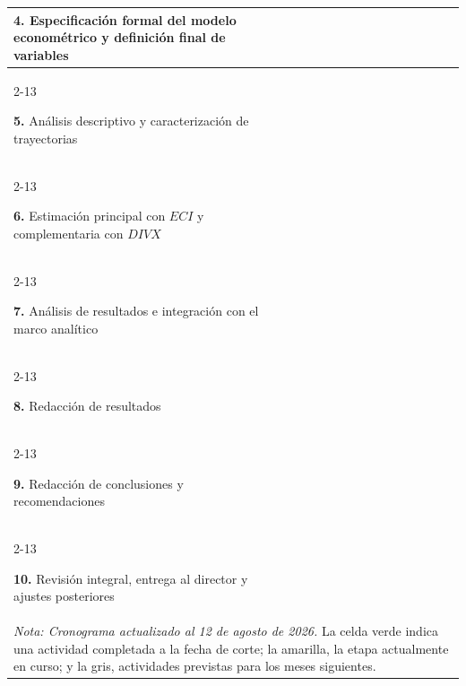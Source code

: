 \documentclass[../../TFM.tex]{subfiles}
\begin{document}
\begin{longtable}{|p{6.2cm}|*{12}{c|}}
		\textbf{4.} Especificación formal del modelo econométrico y definición final de variables
		&  &  & \cellcolor{green!20} & \cellcolor{green!20} &  &  &  &  &  &  &  &  \\
		\cline{2-13}
 
		\textbf{5.} Análisis descriptivo y caracterización de trayectorias
		&  &  & \cellcolor{green!20} & \cellcolor{green!20} & \cellcolor{green!20} &  &  &  &  &  &  &  \\
		\cline{2-13}
 
		\textbf{6.} Estimación principal con $ECI$ y complementaria con $DIVX$
		&  &  &  & \cellcolor{green!20} & \cellcolor{green!20} & \cellcolor{green!20} &  &  &  &  &  &  \\
		\cline{2-13}
 
		\textbf{7.} Análisis de resultados e integración con el marco analítico
		&  &  &  &  &  & \cellcolor{green!20} & \cellcolor{green!20} & \cellcolor{green!20} &  &  &  &  \\
		\cline{2-13}
 
		\textbf{8.} Redacción de resultados
		&  &  &  &  &  & \cellcolor{green!20} & \cellcolor{green!20} & \cellcolor{green!20} &  &  &  &  \\
		\cline{2-13}
 
		\textbf{9.} Redacción de conclusiones y recomendaciones
		&  &  &  &  &  &  &  & \cellcolor{green!20} &  &  &  &  \\
		\cline{2-13}
 
		\textbf{10.} Revisión integral, entrega al director y ajustes posteriores
		&  &  &  &  &  &  &  & \cellcolor{yellow!50} & \cellcolor{gray!30} & \cellcolor{gray!30} & \cellcolor{gray!30} &  \\
 
		\hline
		\multicolumn{13}{p{\dimexpr\textwidth-2\tabcolsep\relax}}{%
			\textit{Nota: Cronograma actualizado al 12 de agosto de 2026.} La celda
			verde indica una actividad completada a la fecha de corte; la amarilla,
			la etapa actualmente en curso; y la gris, actividades previstas para los
			meses siguientes.
		}

	\end{longtable}
\end{document}

